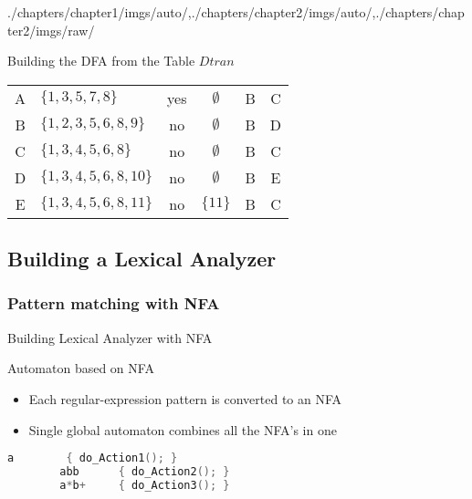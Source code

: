 \begin{graphicspathcontext}{{./chapters/chapter1/imgs/auto/},{./chapters/chapter2/imgs/auto/},{./chapters/chapter2/imgs/raw/}}
\begin{bibunit}[apalike]
\begin{frame}{Building the DFA from the Table $Dtran$}
	\begin{scriptsize}
	\begin{tabularx}{\linewidth}{|c|X|c|c|c|c|}
		\hline
		\tabularheading\chead{Label}&\chead{$Dstates$}&\chead{Init.}&\chead{Final}&\chead{\texttt{"a"}}&\chead{\texttt{"b"}}\\
		\hline
		A & $\{1,3,5,7,8\}$ & yes & $\emptyset$ & B & C \\\hline
		B & $\{1,2,3,5,6,8,9\}$ & no & $\emptyset$ & B & D \\\hline
		C & $\{1,3,4,5,6,8\}$ & no & $\emptyset$ & B & C \\\hline
		D & $\{1,3,4,5,6,8,10\}$ & no & $\emptyset$ & B & E \\\hline
		E & $\{1,3,4,5,6,8,11\}$ & no & $\{11\}$ & B & C \\\hline
	\end{tabularx}
	\end{scriptsize}
	\vspace{.5cm}
	\centering{}
\end{frame}

\subsection{Building a Lexical Analyzer}
\subsectiontableofcontentslide

\subsubsection{Pattern matching with NFA}
\subsubsectiontableofcontentslide*

\begin{frame}[fragile]{{Building Lexical Analyzer} with NFA}
	\begin{block}{Automaton based on NFA}
		\begin{itemize}
		\item Each regular-expression pattern is converted to an NFA
		\item Single global automaton combines all the NFA's in one
		\end{itemize}
	\end{block}
	\vspace{1cm}
	\begin{example}
		\begin{lstlisting}[language=C,basicstyle={\normalsize}]
		a        { do_Action1(); }
		abb      { do_Action2(); }
		a*b+     { do_Action3(); }
		\end{lstlisting}
	\end{example}
\end{frame}


\end{bibunit}
\end{graphicspathcontext}
